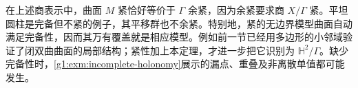 在上述商表示中，曲面 \(M\) 紧恰好等价于 \(\Gamma\) 余紧，因为余紧要求商 \(X/\Gamma\) 紧。平坦圆柱是完备但不紧的例子，其平移群也不余紧。特别地，紧的无边界模型曲面自动满足完备性，因而其万有覆盖就是相应模型。例如前一节已经用多边形的小邻域验证了闭双曲曲面的局部结构；紧性加上本定理，才进一步把它识别为 \(\mathbb H^2/\Gamma\)。缺少完备性时，\cref{g1:exm:incomplete-holonomy}展示的漏点、重叠及非离散单值都可能发生。

